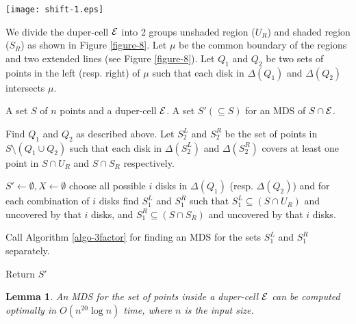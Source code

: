 \documentclass[a4paper,11pt]{article}
\newtheorem{lemma}{Lemma}
\begin{document}
\begin{figure*}[!ht]
\begin{center}
\texttt{[image: shift-1.eps]}
\end{center} 
\caption{Demonstration of $\frac{5}{2}$-factor approximation algorithm}
\label{figure-8}
\end{figure*}

We divide the duper-cell ${\cal E}$ into 2 groups  unshaded region ($U_R$) and shaded region ($S_R$) as shown in 
Figure \ref{figure-8}. Let $\mu$ be the common boundary of the regions and two extended lines 
(see Figure \ref{figure-8}). Let $Q_1$ and $Q_2$ be two sets of points in the left (resp. right) of $\mu$ such 
that each disk in $\Delta(Q_1)$ and $\Delta(Q_2)$ intersects $\mu$. 

\begin{algorithm}[!ht]
\caption{MDS\_for\_duper-cell($S, {\cal E}, n$)}
\begin{algorithmic}[1]
 A set $S$ of $n$ points and a duper-cell ${\cal E}$.
 A set $S' (\subseteq S)$ for an MDS of $S \cap {\cal E}$.

\STATE Find $Q_1$ and $Q_2$ as described above. 
\STATE Let $S_2^L$ and $S_2^R$ be the set of points in $S\setminus (Q_1 \cup Q_2)$ such that each 
disk in $\Delta(S_2^L)$ and $\Delta(S_2^R)$ covers at least one point in $S \cap U_R$ and 
$S \cap S_R$ respectively. 

\STATE $S' \leftarrow \emptyset, X \leftarrow \emptyset$
  \STATE choose all possible $i$ disks in $\Delta(Q_1)$ (resp. $\Delta(Q_2)$) and for each combination 
  of $i$ disks find $S_1^L$ and $S_1^R$ such that $S_1^L \subseteq (S \cap U_R)$ and uncovered by that $i$ disks, 
  and $S_1^R \subseteq (S \cap S_R)$ and uncovered by that $i$ disks.
  
  \STATE Call Algorithm \ref{algo-3factor} for finding an MDS for the sets $S_1^L$ and $S_1^R$ separately.

\ENDFOR
\STATE Return $S'$
\end{algorithmic}
\label{algo-shifting}
\end{algorithm}

\begin{lemma} \label{lemma-9x}
An MDS for the set of points inside a duper-cell ${\cal E}$ can be computed optimally 
in $O(n^{20} \log n)$ time, where $n$ is the input size.
\end{lemma}
\end{document}
